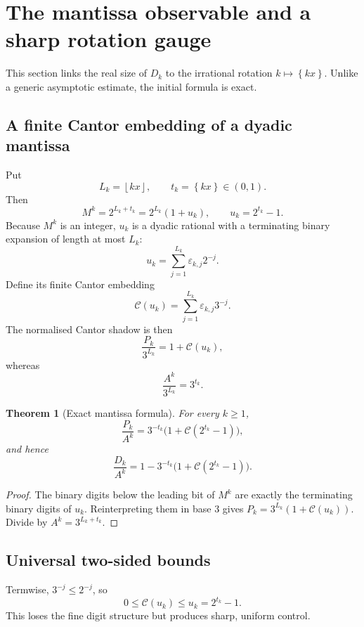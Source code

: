 \documentclass[11pt]{article}
\newtheorem{theorem}{Theorem}[section]
\theoremstyle{definition}
\theoremstyle{remark}
\newcommand{\floor}[1]{\left\lfloor #1\right\rfloor}
\newcommand{\fracpart}[1]{\left\{#1\right\}}
\newcommand{\Cantor}{\mathcal C}
\begin{document}
\section{The mantissa observable and a sharp rotation gauge}

This section links the real size of $D_k$ to the irrational rotation
$k\mapsto\fracpart{kx}$.  Unlike a generic asymptotic estimate, the initial
formula is exact.

\subsection{A finite Cantor embedding of a dyadic mantissa}

Put
\[
  L_k=\floor{kx},\qquad t_k=\fracpart{kx}\in(0,1).
\]
Then
\[
  M^k=2^{L_k+t_k}=2^{L_k}(1+u_k),
  \qquad u_k=2^{t_k}-1.
\]
Because $M^k$ is an integer, $u_k$ is a dyadic rational with a terminating
binary expansion of length at most $L_k$:
\[
  u_k=\sum_{j=1}^{L_k}\varepsilon_{k,j}2^{-j}.
\]
Define its finite Cantor embedding
\[
  \Cantor(u_k)=\sum_{j=1}^{L_k}\varepsilon_{k,j}3^{-j}.
\]
The normalised Cantor shadow is then
\[
  \frac{P_k}{3^{L_k}}=1+\Cantor(u_k),
\]
whereas
\[
  \frac{A^k}{3^{L_k}}=3^{t_k}.
\]

\begin{theorem}[Exact mantissa formula]\label{thm:mantissa}
For every $k\ge1$,
\begin{equation}\label{eq:mantissa-ratio}
 \boxed{
 \frac{P_k}{A^k}
 =3^{-t_k}\bigl(1+\Cantor(2^{t_k}-1)\bigr),}
\end{equation}
and hence
\begin{equation}\label{eq:defect-observable}
 \boxed{
 \frac{D_k}{A^k}
 =1-3^{-t_k}\bigl(1+\Cantor(2^{t_k}-1)\bigr).}
\end{equation}
\end{theorem}

\begin{proof}
The binary digits below the leading bit of $M^k$ are exactly the terminating
binary digits of $u_k$.  Reinterpreting them in base $3$ gives
$P_k=3^{L_k}(1+\Cantor(u_k))$.  Divide by
$A^k=3^{L_k+t_k}$.
\end{proof}

\subsection{Universal two-sided bounds}

Termwise, $3^{-j}\le2^{-j}$, so
\[
  0\le\Cantor(u_k)\le u_k=2^{t_k}-1.
\]
This loses the fine digit structure but produces sharp, uniform control.
\end{document}
